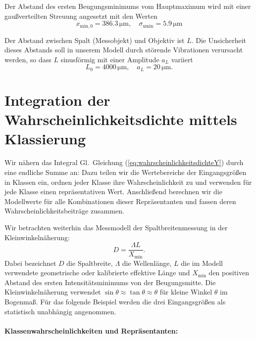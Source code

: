 Der Abstand des ersten Beugungsminimums vom Hauptmaximum wird mit einer gaußverteilten Streuung angesetzt mit den Werten 
$$
x_\mathrm{min,0} = 386.3\, \mathrm{\mu m}, \quad \sigma_\mathrm{xmin} = 5.9 \, \mathrm{\mu m}
$$

Der Abstand zwischen Spalt (Messobjekt) und Objektiv ist $L$. Die Unsicherheit dieses Abstands soll in unserem Modell durch störende Vibrationen verursacht werden, so dass $L$ sinusförmig mit einer Amplitude $a_L$ variiert
$$
L_0 = 4000 \, \mathrm{\mu m}, \quad a_L = 20 \, \mathrm{\mu m}.
$$


\section{Integration der Wahrscheinlichkeitsdichte mittels Klassierung}
\label{GUMS1alternativKlassieren}

Wir nähern das Integral Gl.\ Gleichung (\ref{eq:wahrscheinlichkeitsdichteY})  durch eine endliche Summe an: Dazu teilen wir die Wertebereiche der
Eingangsgrößen in Klassen ein, ordnen jeder Klasse ihre Wahrscheinlichkeit
zu und verwenden für jede Klasse einen repräsentativen Wert.
Anschließend berechnen wir die Modellwerte für alle Kombinationen dieser
Repräsentanten und fassen deren Wahrscheinlichkeitsbeiträge zusammen.

Wir betrachten weiterhin das Messmodell der Spaltbreitenmessung
in der Kleinwinkelnäherung:
\begin{equation}
D=\frac{\Lambda L}{X_{\mathrm{min}}}.
\label{eq:einfachNaeherungSpalt}
\end{equation}
Dabei bezeichnet $D$ die Spaltbreite, $\Lambda$ die Wellenlänge,
$L$ die im Modell verwendete geometrische oder kalibrierte effektive
Länge und $X_{\mathrm{min}}$ den positiven Abstand des ersten
Intensitätsminimums von der Beugungsmitte.
Die Kleinwinkelnäherung verwendet $\sin\theta\approx\tan\theta\approx\theta$
für kleine Winkel $\theta$ im Bogenmaß.
Für das folgende Beispiel werden die drei Eingangsgrößen als
statistisch unabhängig angenommen.

\paragraph{Klassenwahrscheinlichkeiten und Repräsentanten:}

